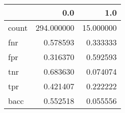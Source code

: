 \begin{tabular}{lrr}
\toprule
{} &         0.0 &        1.0 \\
\midrule
count &  294.000000 &  15.000000 \\
fnr   &    0.578593 &   0.333333 \\
fpr   &    0.316370 &   0.592593 \\
tnr   &    0.683630 &   0.074074 \\
tpr   &    0.421407 &   0.222222 \\
bacc  &    0.552518 &   0.055556 \\
\bottomrule
\end{tabular}
